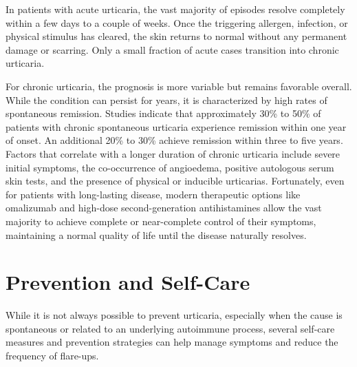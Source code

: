 In patients with acute urticaria, the vast majority of episodes resolve completely within a few days to a couple of weeks. Once the triggering allergen, infection, or physical stimulus has cleared, the skin returns to normal without any permanent damage or scarring. Only a small fraction of acute cases transition into chronic urticaria.

For chronic urticaria, the prognosis is more variable but remains favorable overall. While the condition can persist for years, it is characterized by high rates of spontaneous remission. Studies indicate that approximately 30\% to 50\% of patients with chronic spontaneous urticaria experience remission within one year of onset. An additional 20\% to 30\% achieve remission within three to five years. Factors that correlate with a longer duration of chronic urticaria include severe initial symptoms, the co-occurrence of angioedema, positive autologous serum skin tests, and the presence of physical or inducible urticarias. Fortunately, even for patients with long-lasting disease, modern therapeutic options like omalizumab and high-dose second-generation antihistamines allow the vast majority to achieve complete or near-complete control of their symptoms, maintaining a normal quality of life until the disease naturally resolves.

\section*{Prevention and Self-Care}
While it is not always possible to prevent urticaria, especially when the cause is spontaneous or related to an underlying autoimmune process, several self-care measures and prevention strategies can help manage symptoms and reduce the frequency of flare-ups.

